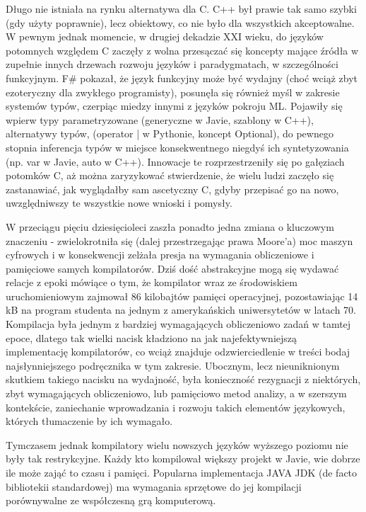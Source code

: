 Długo nie istniała na rynku alternatywa dla C. C++ był prawie tak samo szybki (gdy użyty poprawnie), lecz obiektowy, co nie było dla wszystkich akceptowalne. W pewnym jednak momencie, w drugiej dekadzie XXI wieku, do języków potomnych względem C zaczęły z wolna przesączać się koncepty mające źródła w zupełnie innych drzewach rozwoju języków i paradygmatach, w szczególności funkcyjnym. F\# pokazał, że język funkcyjny może być wydajny (choć wciąż zbyt ezoteryczny dla zwykłego programisty), posunęła się również myśl w zakresie systemów typów, czerpiąc miedzy innymi z języków pokroju ML. Pojawiły się wpierw typy parametryzowane (generyczne w Javie, szablony w C++), alternatywy typów, (operator | w Pythonie, koncept Optional), do pewnego stopnia inferencja typów w miejsce konsekwentnego niegdyś ich syntetyzowania (np. var w Javie, auto w C++). Innowacje te rozprzestrzeniły się po gałęziach potomków C, aż można zaryzykować stwierdzenie, że wielu ludzi zaczęło się zastanawiać, jak wyglądałby sam ascetyczny C, gdyby przepisać go na nowo, uwzględniwszy te wszystkie nowe wnioski i pomysły.

W przeciągu pięciu dziesięcioleci zaszła ponadto jedna zmiana o kluczowym znaczeniu - zwielokrotniła się (dalej przestrzegając prawa Moore'a) moc maszyn cyfrowych i w konsekwencji zelżała presja na wymagania obliczeniowe i pamięciowe samych kompilatorów. Dziś dość abstrakcyjne mogą się wydawać relacje z epoki mówiące o tym, że kompilator wraz ze środowiskiem uruchomieniowym zajmował 86 kilobajtów pamięci operacyjnej, pozostawiając 14 kB na program studenta na jednym z amerykańskich uniwersytetów w latach 70. Kompilacja była jednym z bardziej wymagających obliczeniowo zadań w tamtej epoce, dlatego tak wielki nacisk kładziono na jak najefektywniejszą implementację kompilatorów, co wciąż znajduje odzwierciedlenie w treści bodaj najsłynniejszego podręcznika w tym zakresie\cite{DRAGON_BOOK}.
Ubocznym, lecz nieuniknionym skutkiem takiego nacisku na wydajność, była konieczność rezygnacji z niektórych, zbyt wymagających obliczeniowo, lub pamięciowo metod analizy, a w szerszym kontekście, zaniechanie wprowadzania i rozwoju takich elementów językowych, których tłumaczenie by ich wymagało.

Tymczasem jednak kompilatory wielu nowszych języków wyższego poziomu nie były tak restrykcyjne. Każdy kto kompilował większy projekt w Javie, wie dobrze ile może zająć to czasu i pamięci. Popularna implementacja JAVA JDK (de facto bibliotekii standardowej) ma wymagania sprzętowe do jej kompilacji porównywalne ze współczesną grą komputerową\cite{jdk_build_requirements}.

